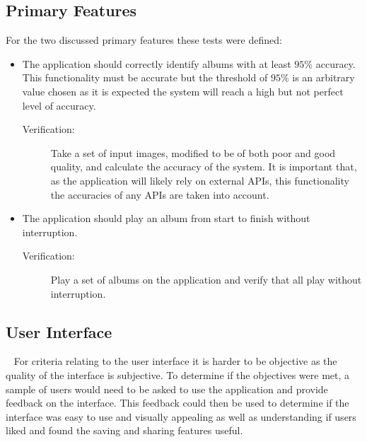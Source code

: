 \subsection{Primary Features}
For the two discussed primary features these tests were defined:
\begin{itemize}
    \item The application should correctly identify albums with at least $95\%$ accuracy. This functionality must be accurate but the threshold of $95\%$ is an arbitrary value chosen as it is expected the system will reach a high but not perfect level of accuracy.
    \begin{description}
        \item[Verification:] Take a set of input images, modified to be of both poor and good quality, and calculate the accuracy of the system. It is important that, as the application will likely rely on external APIs, this functionality the accuracies of any APIs are taken into account.
    \end{description}
    \item The application should play an album from start to finish without interruption.
    \begin{description}
        \item[Verification:] Play a set of albums on the application and verify that all play without interruption.
    \end{description}
\end{itemize}

\subsection{User Interface}~\label{sec:ui-tests}
For criteria relating to the user interface it is harder to be objective as the quality of the interface is subjective. To determine if the objectives were met, a sample of users would need to be asked to use the application and provide feedback on the interface. This feedback could then be used to determine if the interface was easy to use and visually appealing as well as understanding if users liked and found the saving and sharing features useful.

